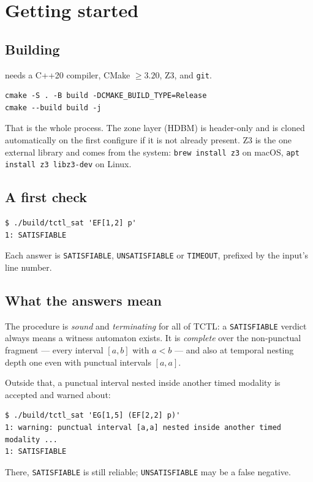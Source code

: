 \section{Getting started}

\subsection{Building}

\tool needs a C++20 compiler, CMake $\geq 3.20$,
Z3, and \texttt{git}.

\begin{lstlisting}
cmake -S . -B build -DCMAKE_BUILD_TYPE=Release
cmake --build build -j
\end{lstlisting}

\noindent
That is the whole process.  The zone layer (HDBM) is header-only and is cloned
automatically on the first configure if it is not already present.  Z3 is the
one external library and comes from the system: \texttt{brew install z3} on
macOS, \texttt{apt install z3 libz3-dev} on Linux.

\subsection{A first check}

\begin{lstlisting}
$ ./build/tctl_sat 'EF[1,2] p'
1: SATISFIABLE
\end{lstlisting}

\noindent
Each answer is \texttt{SATISFIABLE}, \texttt{UNSATISFIABLE} or
\texttt{TIMEOUT}, prefixed by the input's line number.

\subsection{What the answers mean}

The procedure is \emph{sound} and \emph{terminating} for all of TCTL: a
\texttt{SATISFIABLE} verdict always means a witness automaton exists.  It is
\emph{complete} over the non-punctual fragment --- every interval $[a,b]$ with
$a<b$ --- and also at temporal nesting depth one even with punctual intervals
$[a,a]$.

Outside that, a punctual interval nested inside another timed modality is
accepted and warned about:

\begin{lstlisting}
$ ./build/tctl_sat 'EG[1,5] (EF[2,2] p)'
1: warning: punctual interval [a,a] nested inside another timed modality ...
1: SATISFIABLE
\end{lstlisting}

\noindent
There, \texttt{SATISFIABLE} is still reliable; \texttt{UNSATISFIABLE} may be a
false negative.

